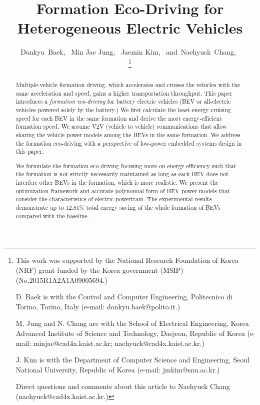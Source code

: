 \documentclass{IEEEtran}
\begin{document}
\title{Formation Eco-Driving for Heterogeneous Electric Vehicles}

\author{
Donkyu~Baek,~  
Min Jae Jung,~
Jaemin Kim,~
and~Naehyuck~Chang,~

\thanks{
This work was supported by the National Research Foundation of Korea (NRF) grant funded by the Korea government (MSIP) (No.2015R1A2A1A09005694.) 

D. Baek is with the Control and Computer Engineering, Politecnico di Torino, Torino, Italy (e-mail: donkyu.baek@polito.it.)

M. Jung and N. Chang are with the School of Electrical Engineering, Korea Advanced Institute of Science and Technology, Daejeon, Republic of Korea (e-mail: minjae@cad4x.kaist.ac.kr; naehyuck@cad4x.kaist.ac.kr.)

J. Kim is with the Department of Computer Science and Engineering, Seoul National University, Republic of Korea (e-mail: jmkim@snu.ac.kr.)

Direct questions and comments about this article to Naehyuck Chang (naehyuck@cad4x.kaist.ac.kr.)}
}

\maketitle

\begin{abstract}
Multiple-vehicle formation driving, which accelerates and cruises the vehicles with the same acceleration and speed, gains a higher transportation throughput. This paper introduces a \textit{formation eco-driving} for battery electric vehicles (BEV or all-electric vehicles powered solely by the battery.) We first calculate the least-energy cruising speed for each BEV in the same formation and derive the most energy-efficient formation speed. We assume V2V (vehicle to vehicle) communications that allow sharing the vehicle power models among the BEVs in the same formation. We address the formation eco-driving with a perspective of low-power embedded systems design in this paper.

We formulate the formation eco-driving focusing more on energy efficiency such that the formation is not strictly necessarily maintained as long as each BEV does not interfere other BEVs in the formation, which is more realistic. We present the optimization framework and accurate polynomial form of BEV power models that consider the characteristics of electric powertrain. The experimental results demonstrate up to 12.81\% total energy saving of the whole formation of BEVs compared with the baseline. 
\end{abstract}
\end{document}
